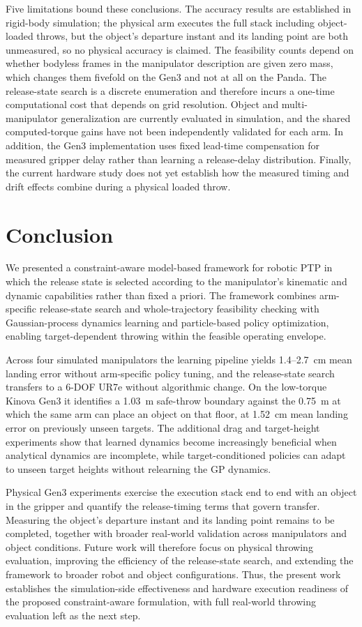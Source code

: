 \documentclass[letterpaper, 10 pt, conference]{ieeeconf}
\begin{document}
Five limitations bound these conclusions. The accuracy results are established
in rigid-body simulation; the physical arm executes the full stack including
object-loaded throws, but the object's departure instant and its landing point
are both unmeasured, so no physical accuracy is claimed. The feasibility counts
depend on whether bodyless frames in the manipulator description are given zero
mass, which changes them fivefold on the Gen3 and not at all on the Panda. The release-state search is a discrete enumeration and therefore
incurs a one-time computational cost that depends on grid resolution. Object
and multi-manipulator generalization are currently evaluated in simulation, and
the shared computed-torque gains have not been independently validated for each
arm. In addition, the Gen3 implementation uses fixed lead-time compensation
for measured gripper delay rather than learning a release-delay distribution.
Finally, the current hardware study does not yet establish how the measured
timing and drift effects combine during a physical loaded throw.


\section{Conclusion}
\label{sec:conclusion}

We presented a constraint-aware model-based framework for robotic PTP in which the release state is selected according to the manipulator's kinematic and dynamic capabilities rather than fixed a priori. The framework combines arm-specific release-state search and whole-trajectory feasibility checking with Gaussian-process dynamics learning and particle-based policy optimization, enabling target-dependent throwing within the feasible operating envelope.

Across four simulated manipulators the learning pipeline yields 1.4--2.7~cm mean landing error without arm-specific policy tuning, and the release-state search transfers to a 6-DOF UR7e without algorithmic change. On the low-torque Kinova Gen3 it identifies a 1.03~m safe-throw boundary against the 0.75~m at which the same arm can place an object on that floor, at 1.52~cm mean landing error on previously unseen targets. The additional drag and target-height experiments show that learned dynamics become increasingly beneficial when analytical dynamics are incomplete, while target-conditioned policies can adapt to unseen target heights without relearning the GP dynamics.

Physical Gen3 experiments exercise the execution stack end to end with an object in the gripper and quantify the release-timing terms that govern transfer. Measuring the object's departure instant and its landing point remains to be completed, together with broader real-world validation across manipulators and object conditions. Future work will therefore focus on physical throwing evaluation, improving the efficiency of the release-state search, and extending the framework to broader robot and object configurations. Thus, the present work establishes the simulation-side effectiveness and hardware execution readiness of the proposed constraint-aware formulation, with full real-world throwing evaluation left as the next step.





\end{document}
